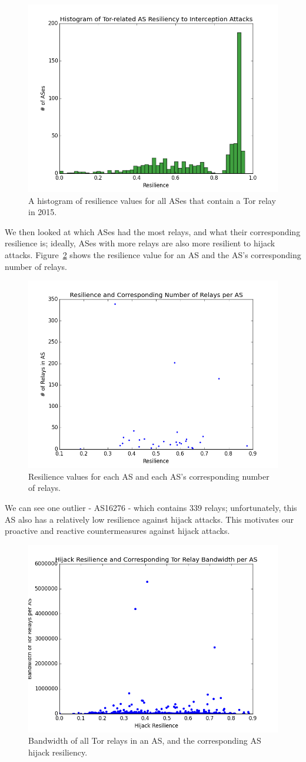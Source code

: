 \begin{figure}
\centering
\includegraphics[width=.5\textwidth]{interception_resiliency}
\caption{A histogram of resilience values for all ASes that contain a Tor relay in 2015.}
\label{fig:interception_histogram}
\end{figure}

We then looked at which ASes had the most relays, and what their corresponding resilience is; ideally, ASes with more relays are also more resilient to hijack attacks.  Figure~\ref{fig:res_relays} shows the resilience value for an AS and the AS's corresponding number of relays.  

\begin{figure}
\centering
\includegraphics[width=.5\textwidth]{res_num_relays}
\caption{Resilience values for each AS and each AS's corresponding number of relays.}
\label{fig:res_relays}
\end{figure}

We can see one outlier - AS16276 - which contains 339 relays; unfortunately, this AS also has a relatively low resilience against hijack attacks.  This motivates our proactive and reactive countermeasures against hijack attacks.

\begin{figure}
\centering
\includegraphics[width=.5\textwidth]{hijack_bandwidth}
\caption{Bandwidth of all Tor relays in an AS, and the corresponding AS hijack resiliency.}
\label{fig:hijack_bw}
\end{figure}


